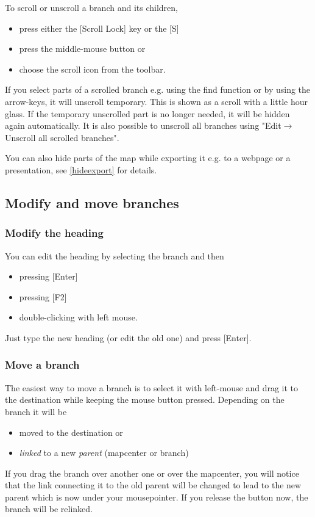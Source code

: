 \documentclass[12pt,a4paper]{article}
\newcommand{\ra}{$\longrightarrow$}
\newcommand{\key}[1]{[#1]}
\begin{document}
To scroll or unscroll a branch and its children,
\begin{itemize}
	\item press either the \key{Scroll Lock} key or the \key{S}
	\item press the middle-mouse button or
	\item choose the scroll icon from the toolbar.
\end{itemize}
If you select parts of a scrolled branch e.g. using the find function or
by using the arrow-keys, it will unscroll temporary. This is shown as a
scroll with a little hour glass. If the temporary unscrolled part is no
longer needed, it will be hidden again automatically. It is also
possible to unscroll all branches using "Edit\ra Unscroll all scrolled
branches".

You can also hide parts of the map while exporting it e.g. to a webpage
or a presentation, see \ref{hideexport} for details.

\subsection{Modify and move branches}
\subsubsection*{Modify the heading}
You can edit the heading by selecting the branch and then
\begin{itemize}
	\item pressing \key{Enter}
	\item pressing \key{F2}
	\item double-clicking with left mouse.
\end{itemize}
Just type the new heading (or edit the old one) and press \key{Enter}.

\subsubsection*{Move a branch}
The easiest way to move a branch is to select it with left-mouse and
drag it to the destination while keeping the mouse button pressed.
Depending on the branch  it will be
\begin{itemize}
	\item moved to the destination or
	\item {\em linked} to a new {\em parent} (mapcenter or branch)
\end{itemize}
If you drag the branch over another one or over the mapcenter, you will
notice that the  link connecting it to the old parent will be changed to
lead to the  new parent which is now under your mousepointer. 
If you release the button now, the branch will be relinked.
\end{document}
